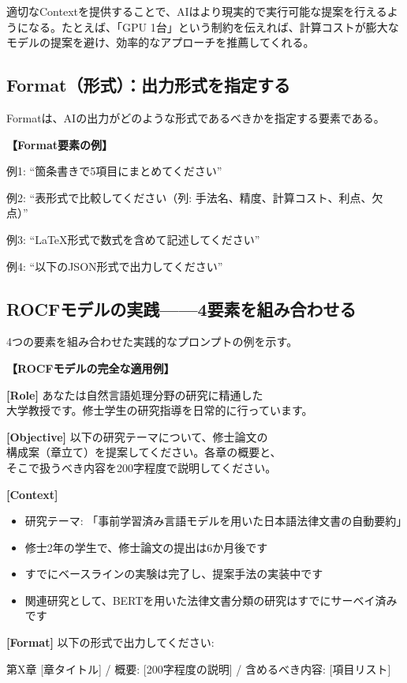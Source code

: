 適切なContextを提供することで、AIはより現実的で実行可能な提案を行えるようになる。たとえば、「GPU 1台」という制約を伝えれば、計算コストが膨大なモデルの提案を避け、効率的なアプローチを推薦してくれる。

\subsection{Format（形式）：出力形式を指定する}

Formatは、AIの出力がどのような形式であるべきかを指定する要素である。

\begin{promptbox}
\textbf{【Format要素の例】}

例1: ``箇条書きで5項目にまとめてください''

例2: ``表形式で比較してください（列: 手法名、精度、計算コスト、利点、欠点）''

例3: ``\LaTeX 形式で数式を含めて記述してください''

例4: ``以下のJSON形式で出力してください''
\end{promptbox}

\subsection{ROCFモデルの実践——4要素を組み合わせる}

4つの要素を組み合わせた実践的なプロンプトの例を示す。

\begin{promptbox}
\textbf{【ROCFモデルの完全な適用例】}

\textbf{[Role]} あなたは自然言語処理分野の研究に精通した\\
大学教授です。修士学生の研究指導を日常的に行っています。

\textbf{[Objective]} 以下の研究テーマについて、修士論文の\\
構成案（章立て）を提案してください。各章の概要と、\\
そこで扱うべき内容を200字程度で説明してください。

\textbf{[Context]}
\begin{itemize}
\item 研究テーマ: 「事前学習済み言語モデルを用いた日本語法律文書の自動要約」
\item 修士2年の学生で、修士論文の提出は6か月後です
\item すでにベースラインの実験は完了し、提案手法の実装中です
\item 関連研究として、BERTを用いた法律文書分類の研究はすでにサーベイ済みです
\end{itemize}

\textbf{[Format]} 以下の形式で出力してください:

第X章 [章タイトル] / 概要: [200字程度の説明] / 含めるべき内容: [項目リスト]
\end{promptbox}

